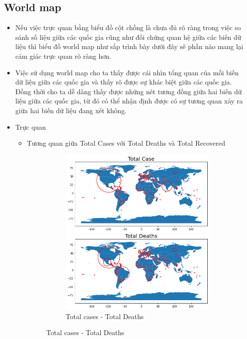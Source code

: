 \documentclass[a4paper, 12pt]{article}
\begin{document}
    \subsection{World map}

    \begin{itemize}
        \item Nếu việc trực quan bằng biểu đồ cột chồng là chưa đủ rõ ràng trong việc so sánh số liệu giữa các quốc gia cũng như đối chứng quan hệ giữa các biến dữ liệu thì biểu đồ world map như sắp trình bày dưới đây sẽ phần nào mang lại cảm giác trực quan rõ ràng hơn.
        \item Việc sử dụng world map cho ta thấy được cái nhìn tổng quan của mỗi biến dữ liệu giữa các quốc gia và thấy rõ được sự khác biệt giữa các quốc gia. Đồng thời cho ta dễ dàng thấy được những nét tương đồng giữa hai biến dữ liệu giữa các quốc gia, từ đó có thể nhận định được có sự tương quan xảy ra giữa hai biến dữ liệu đang xét không.
        \item Trực quan
        \begin{itemize}
            \item Tương quan giữa Total Cases với Total Deaths và Total Recovered
            \begin{figure}[H]
                \begin{subfigure}{.5\textwidth}
                    \centering
                    \includegraphics[width=1\linewidth]{img/case_death.png}  
                    \caption{Total cases - Total Deaths}
    

\end{subfigure}
\end{figure}
\end{itemize}
\end{itemize}
\end{document}
